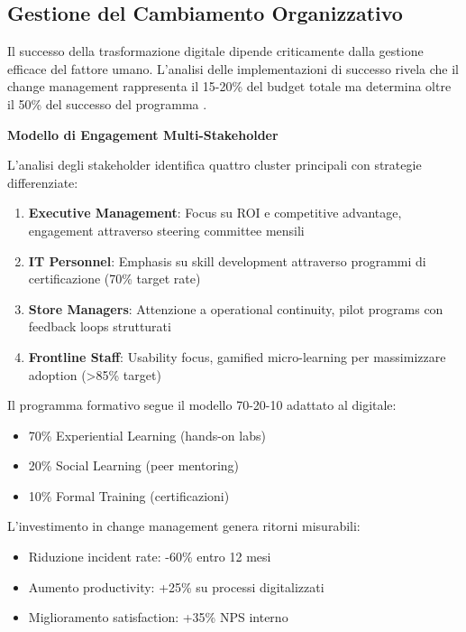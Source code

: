 \subsection{Gestione del Cambiamento Organizzativo}

Il successo della trasformazione digitale dipende criticamente dalla gestione efficace del fattore umano. L'analisi delle implementazioni di successo rivela che il change management rappresenta il 15-20\% del budget totale ma determina oltre il 50\% del successo del programma \autocite{westerman2024leading}.

\textbf{Modello di Engagement Multi-Stakeholder}

L'analisi degli stakeholder identifica quattro cluster principali con strategie differenziate:

\begin{enumerate}
    \item \textbf{Executive Management}: Focus su ROI e competitive advantage, engagement attraverso steering committee mensili
    \item \textbf{IT Personnel}: Emphasis su skill development attraverso programmi di certificazione (70\% target rate)
    \item \textbf{Store Managers}: Attenzione a operational continuity, pilot programs con feedback loops strutturati
    \item \textbf{Frontline Staff}: Usability focus, gamified micro-learning per massimizzare adoption (>85\% target)
\end{enumerate}

Il programma formativo segue il modello 70-20-10 adattato al digitale:
\begin{itemize}
    \item 70\% Experiential Learning (hands-on labs)
    \item 20\% Social Learning (peer mentoring)
    \item 10\% Formal Training (certificazioni)
\end{itemize}

L'investimento in change management genera ritorni misurabili:
\begin{itemize}
    \item Riduzione incident rate: -60\% entro 12 mesi
    \item Aumento productivity: +25\% su processi digitalizzati
    \item Miglioramento satisfaction: +35\% NPS interno
\end{itemize}

